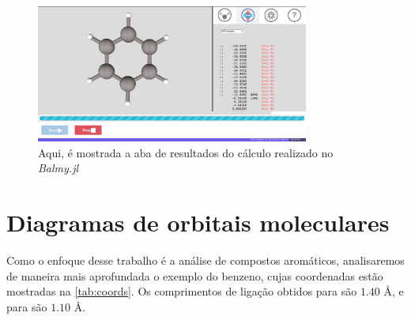 \begin{figure}[htb]
	\caption{\label{fig:results} Aqui, é mostrada a aba de resultados do cálculo realizado no \textit{Balmy.jl}}
	\begin{center}
		\includegraphics[width=0.8\textwidth]{images/results.png}
	\end{center}
\end{figure}

\section{Diagramas de orbitais moleculares}\label{sec:benzene}

Como o enfoque desse trabalho é a análise de compostos aromáticos, analisaremos de maneira mais aprofundada o exemplo do benzeno, cujas coordenadas estão mostradas na \autoref{tab:coords}. Os comprimentos de ligação obtidos para  são $1.40$ \AA, e para  são $1.10$ \AA.

